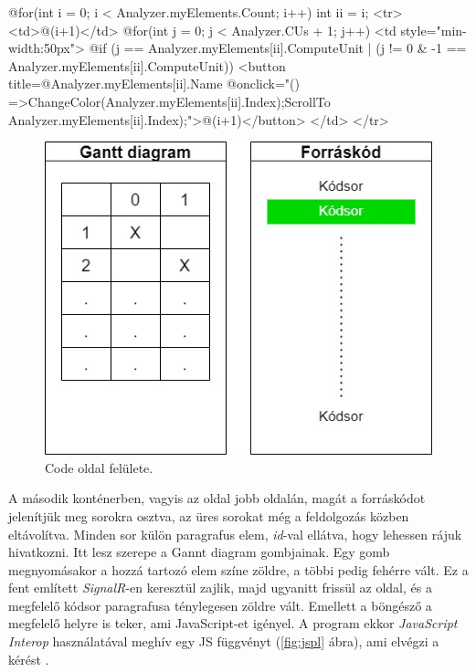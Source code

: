 \begin{cpp}
@for(int i = 0; i < Analyzer.myElements.Count; i++)
 {
   int ii = i;
   <tr>
      <td>@(i+1)</td>
      @for(int j = 0; j < Analyzer.CUs + 1; j++)
        {
          <td style="min-width:50px">
          @if (j == Analyzer.myElements[ii].ComputeUnit | (j != 0 &
               -1 == Analyzer.myElements[ii].ComputeUnit))
             {
                <button title=@Analyzer.myElements[ii].Name @onclick="()
                =>{ChangeColor(Analyzer.myElements[ii].Index);ScrollTo
                Analyzer.myElements[ii].Index);}">@(i+1)</button>
             }
          </td>
        }
   </tr>
 }
\end{cpp}

\begin{figure}[h]
\centering
\includegraphics[scale=0.5]{images/Code_plan.jpg}
\caption{Code oldal felülete.}
\label{fig:code_plan}
\end{figure}

A második konténerben, vagyis az oldal jobb oldalán, magát a forráskódot jelenítjük meg sorokra osztva, az üres sorokat még a feldolgozás közben eltávolítva. Minden sor külön paragrafus elem, \textit{id}-val ellátva, hogy lehessen rájuk hivatkozni. Itt lesz szerepe a Gannt diagram gombjainak. Egy gomb megnyomásakor a hozzá tartozó elem színe zöldre, a többi pedig fehérre vált. Ez a fent említett \textit{SignalR}-en keresztül zajlik, majd ugyanitt frissül az oldal, és a megfelelő kódsor paragrafusa ténylegesen zöldre vált. Emellett a böngésző a megfelelő helyre is teker, ami JavaScript-et igényel. A program ekkor \textit{JavaScript Interop} használatával meghív egy JS függvényt (\ref{fig:jspl} ábra), ami elvégzi a kérést \cite{js_interop}.



